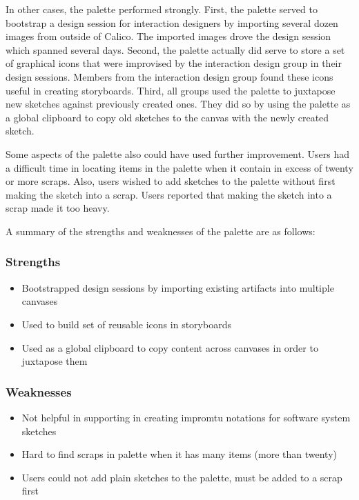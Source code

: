 \documentclass[12pt,fleqn]{ucithesis}
\begin{document}
In other cases, the palette performed strongly. First, the palette served to bootstrap a design session for interaction designers by importing several dozen images  from outside of Calico. The imported images drove the design session which spanned several days. Second, the palette actually did serve to store a set of graphical icons that were improvised by the interaction design group in their design sessions. Members from the interaction design group found these icons useful in creating storyboards. Third, all groups used the palette to juxtapose new sketches against previously created ones. They did so by using the palette as a global clipboard to copy old sketches to the canvas with the newly created sketch.

Some aspects of the palette also could have used further improvement. Users had a difficult time in locating items in the palette when it contain in excess of twenty or more scraps. Also, users wished to add sketches to the palette without first making the sketch into a scrap. Users reported that making the sketch into a scrap made it too heavy.

A summary of the strengths and weaknesses of the palette are as follows:

\subsubsection{Strengths}

\begin{itemize}
	\item Bootstrapped design sessions by importing existing artifacts into multiple canvases
	\item Used to build set of reusable icons in storyboards
	\item Used as a global clipboard to copy content across canvases in order to juxtapose them
\end{itemize}

\subsubsection{Weaknesses}
\begin{itemize}
	\item Not helpful in supporting in creating impromtu notations for software system sketches
	\item Hard to find scraps in palette when it has many items (more than twenty)
	\item Users could not add plain sketches to the palette, must be added to a scrap first
\end{itemize}
\end{document}
